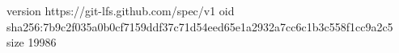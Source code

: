 version https://git-lfs.github.com/spec/v1
oid sha256:7b9c2f035a0b0cf7159ddf37c71d54eed65e1a2932a7cc6c1b3c558f1cc9a2c5
size 19986
